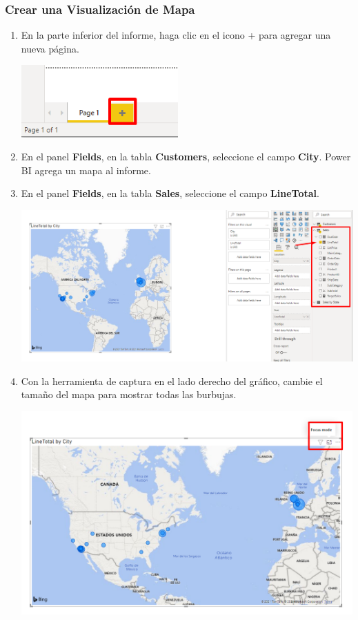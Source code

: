 \documentclass[12pt,letterpaper]{article}
\newcommand\tab[1][1cm]{\hspace*{#1}}
\begin{document}
    \subsubsection{Crear una Visualización de Mapa}
    \begin{enumerate}[\tab 1.]
        \item En la parte inferior del informe, haga clic en el icono + para agregar una nueva página.
        \begin{center}
            \includegraphics[width=6cm]{./img/img119.png}
        \end{center}
        \item En el panel \textbf{Fields}, en la tabla \textbf{Customers}, seleccione el campo \textbf{City}. Power BI agrega un mapa al informe.
        \item En el panel \textbf{Fields}, en la tabla \textbf{Sales}, seleccione el campo \textbf{LineTotal}.
        \begin{center}
            \includegraphics[width=13cm]{./img/img121.png}
        \end{center}
        \item Con la herramienta de captura en el lado derecho del gráfico, cambie el tamaño del mapa para mostrar todas las burbujas.
        \begin{center}
            \includegraphics[width=13cm]{./img/img122.png}

\end{center}
\end{enumerate}
\end{document}
